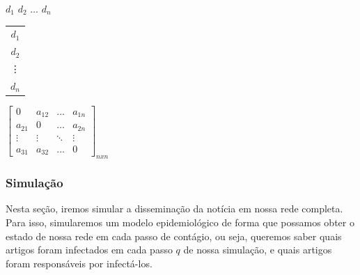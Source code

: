 \documentclass[a4paper,12pt]{article}
\begin{document}
 \begin{center}
 \hspace{0.2cm}$d_{1}$ \hspace{0.5cm} $d_{2}$ \hspace{0.3cm} $\hdots$ \hspace{0.4cm}$d_{n}$
 
 \vspace{0.2cm}
 
 \begin{tabular}{c}
   $d_{1}$ \\
   $d_{2}$ \\
   \vdots\\
   $d_{n}$
 \end{tabular}
 $
 \begin{bmatrix}
  0 & a_{12} & \hdots & a_{1n}\\
  a_{21} & 0 & \hdots & a_{2n}\\
  \vdots & \vdots & \ddots & \vdots\\
  a_{31} & a_{32} & \hdots & 0
 \end{bmatrix}_{nxn}
$

\end{center}

\subsubsection{Simulação}

Nesta seção, iremos simular a disseminação da notícia em nossa rede completa. Para isso, simularemos um modelo epidemiológico de forma
que possamos obter o estado de nossa rede em cada passo de contágio, ou seja, queremos saber quais artigos foram infectados em cada passo
$q$ de nossa simulação, e quais artigos foram responsáveis por infectá-los.
\end{document}

